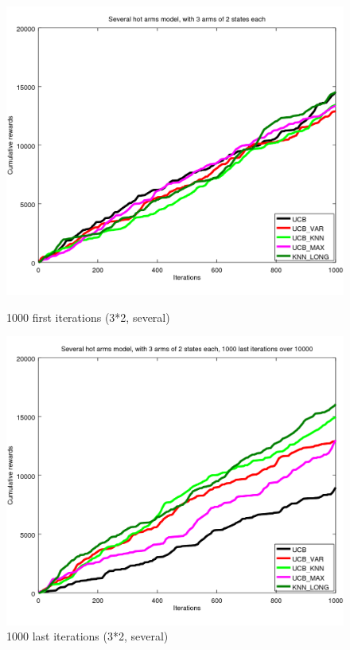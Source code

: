 \documentclass[french]{beamer}
\begin{document}
\begin{frame}
	\begin{figure}[h]
		\begin{minipage}[b]{.49\linewidth}
			\includegraphics[width=1.0\textwidth]{begin_m_1000it.png}
			\caption{1000 first iterations (3*2, several)}
		\end{minipage}
		\hfill
		\begin{minipage}[b]{0.49\linewidth}
			\includegraphics[width=1.0\textwidth]{last_m_1000it.png}
			\caption{1000 last iterations (3*2, several)}
		\end{minipage}
		\label{fig:f}
	\end{figure}
	

\end{frame}
\end{document}
